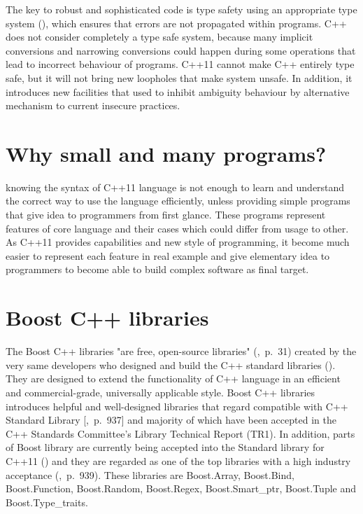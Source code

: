 \documentclass[11pt]{report}
\begin{document}
The key to robust and sophisticated code is type safety using an appropriate type system (\cite{Stroustrup:2005:Cpp}), which ensures that errors are not propagated within programs. C++ does not consider completely a type safe system, because many implicit conversions and narrowing conversions could happen during some operations that lead to incorrect behaviour of programs. C++11 cannot make C++ entirely type safe, but it will not bring new loopholes that make system unsafe. In addition, it introduces new facilities that used to inhibit ambiguity behaviour by alternative mechanism to current insecure practices.

\section{Why small and many programs?}
\label{sec:small and many programs}
knowing the syntax of C++11 language is not enough to learn and understand the correct way to use the language efficiently, unless providing  simple  programs that give idea to programmers from first glance. These programs represent features of core language and their cases which could differ from usage to other. As C++11 provides capabilities and new style of programming, it become much easier to represent each feature in real example and give elementary idea to programmers to become able to build complex software as final target.

\section{Boost C++ libraries}
\label{sec: Boost}
The Boost C++ libraries "are free, open-source libraries" (\cite{Deitel:2012:CPP},~p.~31) created by the very same developers who designed and build the C++ standard libraries (\cite{Schaling:2011:BoostCppLibraries}). They are designed to extend the functionality of C++ language in an efficient and commercial-grade, universally applicable style. Boost C++ libraries introduces helpful and well-designed libraries that regard compatible with C++ Standard Library [\cite{Deitel:2012:CPP},~p.~937] and majority of which have been accepted in the C++ Standards Committee's Library Technical Report (TR1). In addition, parts of Boost library are currently being accepted into the Standard library for C++11 (\cite{Boost:2007:Cpp}) and they are regarded as one of the top libraries with a high industry acceptance (\cite{Deitel:2012:CPP},~p.~939). These libraries are Boost.Array, Boost.Bind, Boost.Function, Boost.Random, Boost.Regex, Boost.Smart\_ptr, Boost.Tuple and Boost.Type\_traits.
\end{document}
